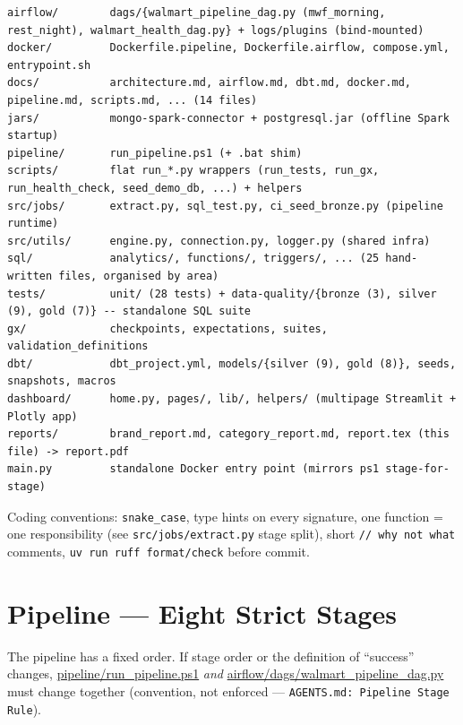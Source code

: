 \documentclass[11pt,a4paper]{article}
\begin{document}
\begin{lstlisting}[style=bash,caption={Top-level layout (trimmed). Mirrors \texttt{AGENTS.md}.}]
airflow/        dags/{walmart_pipeline_dag.py (mwf_morning, rest_night), walmart_health_dag.py} + logs/plugins (bind-mounted)
docker/         Dockerfile.pipeline, Dockerfile.airflow, compose.yml, entrypoint.sh
docs/           architecture.md, airflow.md, dbt.md, docker.md, pipeline.md, scripts.md, ... (14 files)
jars/           mongo-spark-connector + postgresql.jar (offline Spark startup)
pipeline/       run_pipeline.ps1 (+ .bat shim)
scripts/        flat run_*.py wrappers (run_tests, run_gx, run_health_check, seed_demo_db, ...) + helpers
src/jobs/       extract.py, sql_test.py, ci_seed_bronze.py (pipeline runtime)
src/utils/      engine.py, connection.py, logger.py (shared infra)
sql/            analytics/, functions/, triggers/, ... (25 hand-written files, organised by area)
tests/          unit/ (28 tests) + data-quality/{bronze (3), silver (9), gold (7)} -- standalone SQL suite
gx/             checkpoints, expectations, suites, validation_definitions
dbt/            dbt_project.yml, models/{silver (9), gold (8)}, seeds, snapshots, macros
dashboard/      home.py, pages/, lib/, helpers/ (multipage Streamlit + Plotly app)
reports/        brand_report.md, category_report.md, report.tex (this file) -> report.pdf
main.py         standalone Docker entry point (mirrors ps1 stage-for-stage)
\end{lstlisting}

Coding conventions: \texttt{snake\_case}, type hints on every signature, one function = one responsibility (see \texttt{src/jobs/extract.py} stage split), short \texttt{// why not what} comments, \texttt{uv run ruff format/check} before commit.

\section{Pipeline — Eight Strict Stages}

The pipeline has a fixed order. If stage order or the definition of ``success'' changes, \url{pipeline/run_pipeline.ps1} \emph{and} \url{airflow/dags/walmart_pipeline_dag.py} must change together (convention, not enforced — \texttt{AGENTS.md: Pipeline Stage Rule}).
\end{document}

